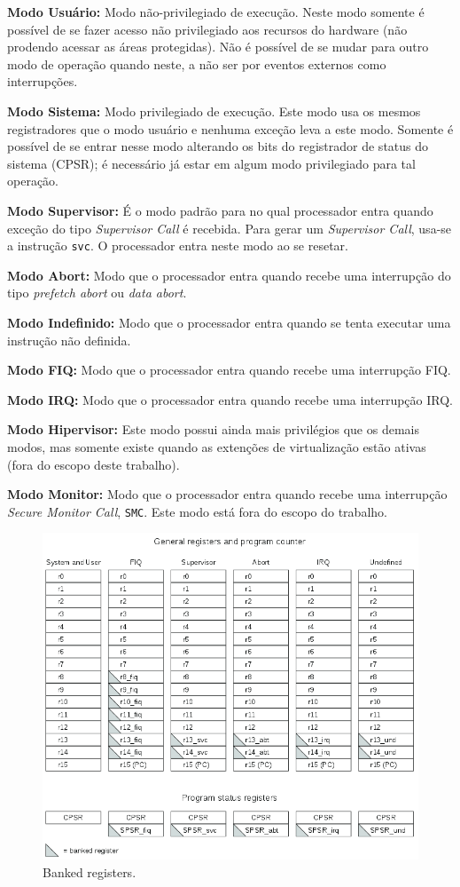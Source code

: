 \textbf{Modo Usuário:} Modo não-privilegiado de execução. Neste modo somente é possível de se fazer acesso não privilegiado aos recursos do hardware (não prodendo acessar as áreas protegidas). Não é possível de se mudar para outro modo de operação quando neste, a não ser por eventos externos como interrupções.

\textbf{Modo Sistema:} Modo privilegiado de execução. Este modo usa os mesmos registradores que o modo usuário e nenhuma exceção leva a este modo. Somente é possível de se entrar nesse modo alterando os bits do registrador de status do sistema (CPSR); é necessário já estar em algum modo privilegiado para tal operação.

\textbf{Modo Supervisor:} É o modo padrão para no qual processador entra quando exceção do tipo \emph{Supervisor Call} é recebida.
Para gerar um \emph{Supervisor Call}, usa-se a instrução \verb+svc+. O processador entra neste modo ao se resetar.

\textbf{Modo Abort:} Modo que o processador entra quando recebe uma interrupção do tipo \emph{prefetch abort} ou \emph{data abort}.

\textbf{Modo Indefinido:} Modo que o processador entra quando se tenta executar uma instrução não definida.

\textbf{Modo FIQ:} Modo que o processador entra quando recebe uma interrupção FIQ.

\textbf{Modo IRQ:} Modo que o processador entra quando recebe uma interrupção IRQ.

\textbf{Modo Hipervisor:} Este modo possui ainda mais privilégios que os demais modos, mas somente existe quando as extenções de virtualização estão ativas (fora do escopo deste trabalho).

\textbf{Modo Monitor:} Modo que o processador entra quando recebe uma interrupção \emph{Secure Monitor Call}, \verb+SMC+. Este modo está fora do escopo do trabalho.


\begin{figure}[ht!]
	\centerline{
    \includegraphics[width=12cm]{figuras/banked_registers}
	}
    \caption{Banked registers.}
\end{figure}



